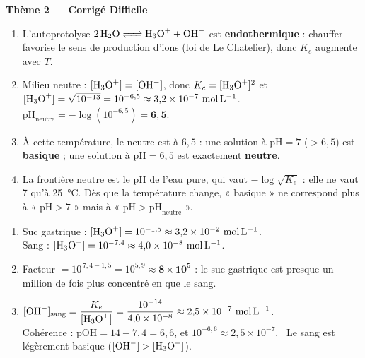 \documentclass[11pt,a4paper]{article}
\begin{document}
\begin{center}
{\LARGE\bfseries\color{primarydark} Thème 2 --- Corrigé Difficile}
\end{center}

\begin{corrbox}
\begin{enumerate}[label=\alph*),leftmargin=1.6em,itemsep=2pt]
  \item L'autoprotolyse $\ce{2 H2O <=> H3O+ + OH-}$ est \textbf{endothermique} : chauffer favorise le sens de
        production d'ions (loi de Le Chatelier), donc $K_e$ augmente avec $T$.
  \item Milieu neutre : $[\ce{H3O+}]=[\ce{OH-}]$, donc $K_e=[\ce{H3O+}]^2$ et
        $[\ce{H3O+}]=\sqrt{10^{-13}} = 10^{-6{,}5}\approx 3{,}2\times10^{-7}\ \si{mol.L^{-1}}$.\\
        $\mathrm{pH}_{\text{neutre}} = -\log(10^{-6{,}5}) = \mathbf{6{,}5}$.
  \item À cette température, le neutre est à $6{,}5$ : une solution à $\mathrm{pH}=7$ ($>6{,}5$) est
        \textbf{basique} ; une solution à $\mathrm{pH}=6{,}5$ est exactement \textbf{neutre}.
  \item La frontière neutre est le pH de l'eau pure, qui vaut $-\log\sqrt{K_e}$ : elle ne vaut 7 qu'à
        \SI{25}{\celsius}. Dès que la température change, « basique » ne correspond plus à « $\mathrm{pH}>7$ »
        mais à « $\mathrm{pH}>\mathrm{pH}_{\text{neutre}}$ ».
\end{enumerate}
\end{corrbox}

\begin{corrbox}
\begin{enumerate}[label=\alph*),leftmargin=1.6em,itemsep=2pt]
  \item Suc gastrique : $[\ce{H3O+}] = 10^{-1{,}5} \approx 3{,}2\times10^{-2}\ \si{mol.L^{-1}}$.\\
        Sang : $[\ce{H3O+}] = 10^{-7{,}4} \approx 4{,}0\times10^{-8}\ \si{mol.L^{-1}}$.
  \item Facteur $= 10^{\,7{,}4-1{,}5} = 10^{5{,}9} \approx \mathbf{8\times10^{5}}$ : le suc gastrique est presque
        un million de fois plus concentré en  que le sang.
  \item $[\ce{OH-}]_{\text{sang}} = \dfrac{K_e}{[\ce{H3O+}]} = \dfrac{10^{-14}}{4{,}0\times10^{-8}}
        \approx 2{,}5\times10^{-7}\ \si{mol.L^{-1}}$.\\
        Cohérence : $\mathrm{pOH} = 14 - 7{,}4 = 6{,}6$, et $10^{-6{,}6}\approx 2{,}5\times10^{-7}$. \checkmark\
        Le sang est légèrement basique ($[\ce{OH-}]>[\ce{H3O+}]$).
\end{enumerate}
\end{corrbox}
\end{document}
